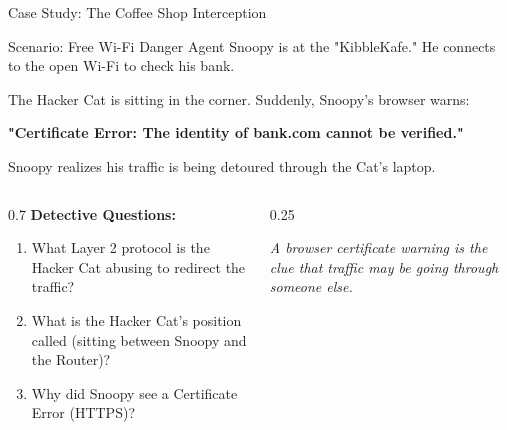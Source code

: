 \documentclass[aspectratio=169]{beamer}  %
\begin{document}
\begin{frame}{Case Study: The Coffee Shop Interception}
    \begin{block}{Scenario: Free Wi-Fi Danger}
        \footnotesize
        Agent Snoopy is at the "KibbleKafe." He connects to the open Wi-Fi to check his bank.
        
        The Hacker Cat is sitting in the corner. Suddenly, Snoopy's browser warns:
        
        \textbf{"Certificate Error: The identity of bank.com cannot be verified."}
        
        Snoopy realizes his traffic is being detoured through the Cat's laptop.
    \end{block}
    \vspace{0.3cm}
    \begin{columns}[T]
        \begin{column}{0.7\textwidth}
            \textbf{Detective Questions:}
            \begin{enumerate}
                \item What Layer 2 protocol is the Hacker Cat abusing to redirect the traffic?
                \item What is the Hacker Cat's position called (sitting between Snoopy and the Router)?
                \item Why did Snoopy see a Certificate Error (HTTPS)?
            \end{enumerate}
        \end{column}
        \begin{column}{0.25\textwidth}
            \begin{center}
            \end{center}
            \vspace{-0.2em}
            \centering\footnotesize\emph{A browser certificate warning is the clue that traffic may be going through someone else.}
        \end{column}
    \end{columns}
\end{frame}
\end{document}
